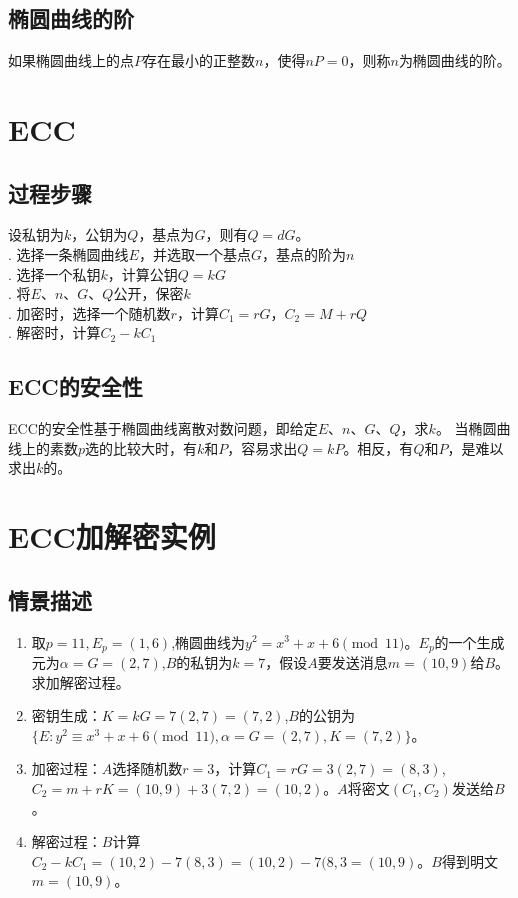\documentclass[a4paper]{article}
\begin{document}
\subsection{椭圆曲线的阶}
如果椭圆曲线上的点$P$存在最小的正整数$n$，使得$nP=0$，则称$n$为椭圆曲线的阶。\\

\section{ECC}
\subsection{过程步骤}
设私钥为$k$，公钥为$Q$，基点为$G$，则有$Q=dG$。\\
. 选择一条椭圆曲线$E$，并选取一个基点$G$，基点的阶为$n$\\
. 选择一个私钥$k$，计算公钥$Q=kG$\\
. 将$E$、$n$、$G$、$Q$公开，保密$k$\\
. 加密时，选择一个随机数$r$，计算$C_1=rG$，$C_2=M+rQ$\\
. 解密时，计算$C_2-kC_1$\\

\subsection{ECC的安全性}
ECC的安全性基于椭圆曲线离散对数问题，即给定$E$、$n$、$G$、$Q$，求$k$。
当椭圆曲线上的素数$p$选的比较大时，有$k$和$P$，容易求出$Q=kP$。相反，有$Q$和$P$，是难以求出$k$的。
\section{ECC加解密实例}
\subsection{情景描述} 
\begin{enumerate}
    \item 取$p=11,E_{p}=(1,6)$,椭圆曲线为$y^2=x^3+x+6\pmod{11}$。$E_{p}$的一个生成元为$\alpha=G=(2,7)$,$B$的私钥为$k=7$，假设$A$要发送消息$m=(10,9)$给$B$。求加解密过程。
    \item 密钥生成：$K=kG=7(2,7)=(7,2)$,$B$的公钥为$\{E:y^{2}\equiv x^{3}+x+6\pmod{11},\alpha=G=(2,7),K=(7,2)\}$。
    \item 加密过程：$A$选择随机数$r=3$，计算$C_{1}=rG=3(2,7)=(8,3)$,$C_{2}=m+rK=(10,9)+3(7,2)=(10,2)$。$A$将密文$(C_{1},C_{2})$发送给$B$。  
    \item 解密过程：$B$计算$C_{2}-kC_{1}=(10,2)-7(8,3)=(10,2)-7(8,3=(10,9)$。$B$得到明文$m=(10,9)$。    
\end{enumerate}
\end{document}
